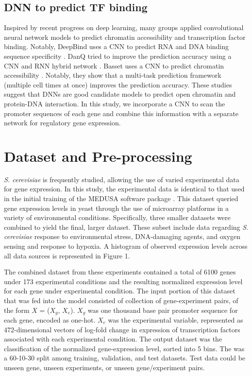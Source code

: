 \documentclass{article}
\begin{document}
\subsection{DNN to predict TF binding}

Inspired by recent progress on deep learning, many groups applied convolutional neural network models to predict chromatin accessibility and transcription factor binding. Notably, DeepBind uses a CNN to predict RNA and DNA binding sequence specificity \cite{Alipanahi:2015fb}. DanQ tried to improve the prediction accuracy using a CNN and RNN hybrid network \cite{Quang:2016jt}. Basset uses a CNN to predict chromatin accessibility \cite{Kelley:2016bv}. Notably, they show that a multi-task prediction framework (multiple cell times at once) improves the prediction accuracy. These studies suggest that DNNs are good candidate models to predict open chromatin and protein-DNA interaction. In this study, we incorporate a CNN to scan the promoter sequences of each gene and combine this information with a separate network for regulatory gene expression. 

\section{Dataset and Pre-processing}

\textit{S. cerevisiae} is frequently studied, allowing the use of varied experimental data for gene expression. In this study, the experimental data is identical to that used in the initial training of the MEDUSA software package \cite{Kundaje:2007hs}. This dataset queried gene expression levels in yeast through the use of microarray platforms in a variety of environmental conditions. Specifically, three smaller datasets were combined to yield the final, larger dataset. These subset include data regarding \textit{S. cerevisiae} response to environmental stress, DNA-damaging agents, and oxygen sensing and response to hypoxia. A histogram of observed expression levels across all data sources is represented in Figure 1. 

The combined dataset from these experiments contained a total of 6100 genes under 173 experimental conditions and the resulting normalized expression level for each gene under experimental condition. The input portion of this dataset that was fed into the model consisted of collection of gene-experiment pairs, of the form $X$ = ($X_g$, $X_e$). $X_g$ was one thousand base pair promoter sequence for each gene, encoded as one-hot. $X_e$ was the experimental variable, represented as 472-dimensional vectors of log-fold change in expression of transcription factors associated with each experimental condition. The output dataset was the classification of the normalized gene-expression level, sorted into 5 bins. The was a 60-10-30 split among training, validation, and test datasets. Test data could be unseen gene, unseen experiments, or unseen gene/experiment pairs.
\end{document}
